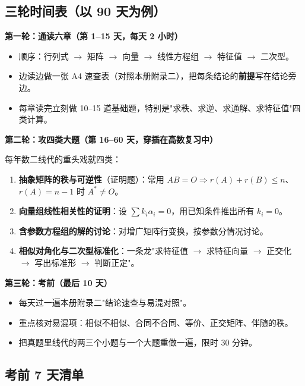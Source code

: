 \documentclass[11pt,openany,UTF8]{ctexbook}
\begin{document}
\subsection{三轮时间表（以 90 天为例）}

\textbf{第一轮：通读六章（第 1--15 天，每天 2 小时）}

\begin{itemize}
\item 顺序：行列式 $\to$ 矩阵 $\to$ 向量 $\to$ 线性方程组 $\to$ 特征值 $\to$ 二次型。
\item 边读边做一张 A4 速查表（对照本册附录二），把每条结论的\textbf{前提}写在结论旁边。
\item 每章读完立刻做 10--15 道基础题，特别是"求秩、求逆、求通解、求特征值"四类计算。
\end{itemize}
\textbf{第二轮：攻四类大题（第 16--60 天，穿插在高数复习中）}

每年数二线代的重头戏就四类：

\begin{enumerate}
\item \textbf{抽象矩阵的秩与可逆性}（证明题）：常用 $AB=O\Rightarrow r(A)+r(B)\le n$、$r(A)=n-1$ 时 $A^*\ne O$。
\item \textbf{向量组线性相关性的证明}：设 $\sum k_i\alpha_i=0$，用已知条件推出所有 $k_i=0$。
\item \textbf{含参数方程组的解的讨论}：对增广矩阵行变换，按参数分情况讨论。
\item \textbf{相似对角化与二次型标准化}：一条龙"求特征值 $\to$ 求特征向量 $\to$ 正交化 $\to$ 写出标准形 $\to$ 判断正定"。
\end{enumerate}
\textbf{第三轮：考前（最后 10 天）}

\begin{itemize}
\item 每天过一遍本册附录二"结论速查与易混对照"。
\item 重点核对易混项：相似不相似、合同不合同、等价、正交矩阵、伴随的秩。
\item 把真题里线代的两三个小题与一个大题重做一遍，限时 30 分钟。
\end{itemize}
\subsection{考前 7 天清单}
\end{document}
